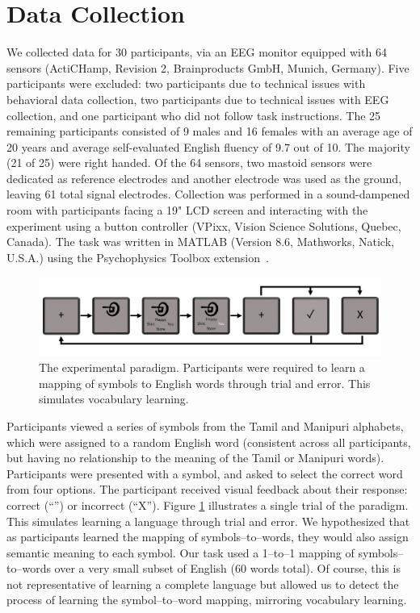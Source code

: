 \section{Data Collection}

We collected data for 30 participants, via an EEG monitor equipped with 64 
sensors (ActiCHamp, Revision 2, Brainproducts GmbH, Munich, Germany). Five 
participants were excluded: two participants due to technical issues with 
behavioral data collection, two participants due to technical issues with EEG 
collection, and one participant who did not follow task instructions. The 25 
remaining participants consisted of 9 males and 16 females with an average age 
of 20 years and average self-evaluated English fluency of 9.7 out of 10.  The 
majority (21 of 25) were right handed. Of the 64 sensors, two mastoid sensors 
were dedicated as reference electrodes and another electrode was used as the 
ground, leaving 61 total signal electrodes.  Collection was performed in a 
sound-dampened room with participants facing a 19" LCD screen and interacting 
with the experiment using a button controller (VPixx, Vision Science Solutions, 
Quebec, Canada).  The task was written in MATLAB (Version 8.6, Mathworks, 
Natick, U.S.A.) using the Psychophysics Toolbox 
extension~\cite{brainard1997psychophysics}.


\begin{figure}[t]
  \centering
  \includegraphics[width=\linewidth]{figures/experiment}
  \caption[Experiment Paradigm]{
    The experimental paradigm. Participants were required to learn a mapping of 
    symbols to English words through trial and error. This simulates vocabulary 
    learning.
  }
  \label{fig:experiment}
\end{figure}

Participants viewed a series of symbols from the Tamil and Manipuri alphabets, 
which were assigned to a random English word (consistent across all 
participants, but having no relationship to the meaning of the Tamil or 
Manipuri words).  Participants were presented with a symbol, and asked to 
select the correct word from four options. The participant received visual 
feedback about their response: correct (``\CheckmarkBold'') or incorrect 
(``X''). Figure \ref{fig:experiment} illustrates a single trial of the 
paradigm. This simulates learning a language through trial and error. We 
hypothesized that as participants learned the mapping of symbols--to--words, 
they would also assign semantic meaning to each symbol. Our task used a 
1--to--1 mapping of symbols--to--words over a very small subset of English (60 
words total). Of course, this is not representative of learning a complete 
language but allowed us to detect the process of learning the symbol--to--word 
mapping, mirroring vocabulary learning.

